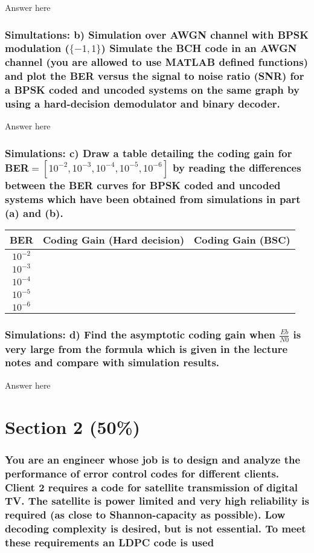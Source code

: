 \documentclass[a4paper]{report}
\begin{document}
Answer here \\

\subsubsection*{Simultations: b) Simulation over AWGN channel with BPSK modulation ($\{−1, 1\}$) Simulate the BCH code in an AWGN channel (you are allowed to use MATLAB defined functions) and plot the BER versus the signal to noise ratio (SNR) for a BPSK coded and uncoded
systems on the same graph by using a hard-decision demodulator and binary decoder.}

Answer here \\

\subsubsection*{Simulations: c) Draw a table detailing the coding gain for BER$= [10^{−2}, 10^{−3}, 10^{−4} , 10^{−5} , 10^{−6} ]$ by reading the differences between the BER curves for BPSK coded and uncoded systems which have been obtained from simulations in part (a) and (b).}

\begin{tabular}{| c | c | c |}
\hline
BER & Coding Gain (Hard decision) & Coding Gain (BSC) \\
\hline
$10^{-2}$ & & \\
\hline
$10^{-3}$ & & \\
\hline
$10^{-4}$ & & \\
\hline
$10^{-5}$ & & \\
\hline
$10^{-6}$ & & \\
\hline
\end{tabular}

\subsubsection*{Simulations: d) Find the asymptotic coding gain when $\frac{Eb}{N0}$ is very large from the formula which is given in the lecture notes and compare with simulation results.}

Answer here \\

\section*{Section 2 (50\%)}

\subsubsection*{You are an engineer whose job is to design and analyze the performance of error
control codes for different clients. Client 2 requires a code for satellite transmission of digital TV. The satellite is power limited and very high reliability is required (as close to Shannon-capacity as possible). Low decoding complexity is desired, but is not essential. To meet these requirements an LDPC code is used}
\end{document}
